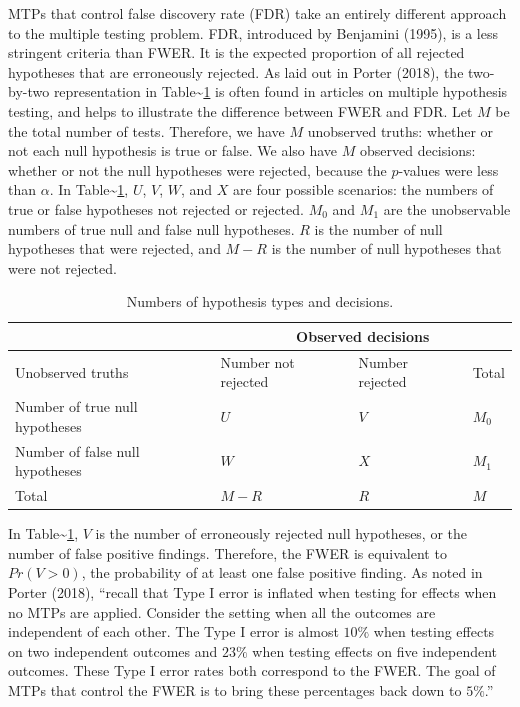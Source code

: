 \documentclass[
]{article}
\begin{document}
MTPs that control false discovery rate (FDR) take an entirely different
approach to the multiple testing problem. FDR, introduced by Benjamini
(1995), is a less stringent criteria than FWER. It is the expected
proportion of all rejected hypotheses that are erroneously rejected. As
laid out in Porter (2018), the two-by-two representation in
Table\textasciitilde{}\ref{tab:twobytwo} is often found in articles on
multiple hypothesis testing, and helps to illustrate the difference
between FWER and FDR. Let \(M\) be the total number of tests. Therefore,
we have \(M\) unobserved truths: whether or not each null hypothesis is
true or false. We also have \(M\) observed decisions: whether or not the
null hypotheses were rejected, because the \(p\)-values were less than
\(\alpha\). In Table\textasciitilde{}\ref{tab:twobytwo}, \(U\), \(V\),
\(W\), and \(X\) are four possible scenarios: the numbers of true or
false hypotheses not rejected or rejected. \(M_0\) and \(M_1\) are the
unobservable numbers of true null and false null hypotheses. \(R\) is
the number of null hypotheses that were rejected, and \(M - R\) is the
number of null hypotheses that were not rejected.

\begin{table}[h!]
\centering
\begin{tabular}{l l l l}
                                      & \multicolumn{3}{c}{Observed decisions}\\ \hline
Unobserved truths                     & Number not rejected     & Number rejected   & Total \\ \hline
Number of true null hypotheses        & $U$                     & $V$               & $M_0$ \\
Number of false null hypotheses       & $W$                     & $X$               & $M_1$ \\ \hline
Total                                 & $M-R$                   & $R$               & $M$
\end{tabular}
\caption{Numbers of hypothesis types and decisions.}
  \label{tab:twobytwo}
\end{table}

In Table\textasciitilde{}\ref{tab:twobytwo}, \(V\) is the number of
erroneously rejected null hypotheses, or the number of false positive
findings. Therefore, the FWER is equivalent to \(Pr(V > 0)\), the
probability of at least one false positive finding. As noted in Porter
(2018), ``recall that Type I error is inflated when testing for effects
when no MTPs are applied. Consider the setting when all the outcomes are
independent of each other. The Type I error is almost \(10\%\) when
testing effects on two independent outcomes and \(23\%\) when testing
effects on five independent outcomes. These Type I error rates both
correspond to the FWER. The goal of MTPs that control the FWER is to
bring these percentages back down to \(5\%\).''
\end{document}
